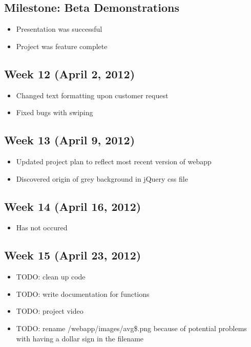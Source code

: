 \documentclass[11pt,a4paper,oneside]{article}
\begin{document}
\subsection{Milestone: Beta Demonstrations}
\begin{itemize}
\item Presentation was successful
\item Project was feature complete
\end{itemize}

\subsection{Week 12 (April 2, 2012)}
\begin{itemize}
\item Changed text formatting upon customer request
\item Fixed bugs with swiping 
\end{itemize}

\subsection{Week 13 (April 9, 2012)}
\begin{itemize}
\item Updated project plan to reflect most recent version of webapp
\item Discovered origin of grey background in jQuery css file
\end{itemize}

\subsection{Week 14 (April 16, 2012)}
\begin{itemize}
\item Has not occured
\end{itemize}

\subsection{Week 15 (April 23, 2012)}
\begin{itemize}
\item TODO: clean up code
\item TODO: write documentation for functions
\item TODO: project video
\item TODO: rename /webapp/images/avg\$.png because of potential problems with having a dollar sign in the filename
\end{itemize}
\end{document}
